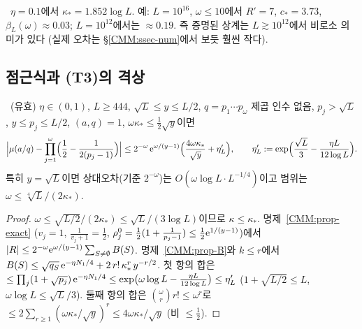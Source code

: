 \begin{remark}\label{CMM:rem-large-num}
\NUMERIC\ $\eta=0.1$에서 $\kappa_*=1.852\log L$. 예: $L=10^{16}$, $\omega\le10$에서 $R'=7$, $c_*=3.73$, $\beta_L(\omega)\approx0.03$;
$L=10^{12}$에서는 $\approx0.19$. 즉 증명된 상계는 $L\gtrsim10^{12}$에서 비로소 의미가 있다
(실제 오차는 \S\ref{CMM:ssec-num}에서 보듯 훨씬 작다).
\end{remark}

\subsection{점근식과 (T3)의 격상}\label{CMM:ssec-asym}

\begin{theorem}[점근식]\label{CMM:thm-asym}
\PROVED\ (유효) $\eta\in(0,1)$, $L\ge444$, $\sqrt L\le y\le L/2$, $q=p_1\cdots p_\omega$ 제곱 인수 없음, $p_j>\sqrt L$, $y\le p_j\le L/2$, $(a,q)=1$,
$\omega\kappa_*\le\frac12\sqrt y$이면
\[
\Bigl|\mu(a/q)-\prod_{j=1}^\omega\Bigl(\frac12-\frac1{2(p_j-1)}\Bigr)\Bigr|\le2^{-\omega}\,\mathrm{e}^{\omega/(y-1)}\Bigl(\frac{4\omega\kappa_*}{\sqrt y}+\eta'_L\Bigr),
\qquad \eta'_L:=\exp\Bigl(\frac{\sqrt L}{3}-\frac{\eta L}{12\log L}\Bigr).
\]
특히 $y=\sqrt L$이면 상대오차(기준 $2^{-\omega}$)는 $O(\omega\log L\cdot L^{-1/4})$이고 범위는 $\omega\le\sqrt[4]L/(2\kappa_*)$.
\end{theorem}
\begin{proof}
$\omega\le\sqrt{L/2}/(2\kappa_*)\le\sqrt L/(3\log L)$이므로 $\kappa\le\kappa_*$. 명제~\ref{CMM:prop-exact} ($v_j=1$, $\frac1{v_j+1}=\frac12$, $\rho^0_j=\frac12(1+\frac1{p_j-1})\le\frac12\mathrm{e}^{1/(y-1)}$)에서
$|R|\le2^{-\omega}\mathrm{e}^{\omega/(y-1)}\sum_{S\ne\emptyset}B(S)$. 명제~\ref{CMM:prop-B}와 $k\le r$에서
$B(S)\le\sqrt{q_S}\,\mathrm{e}^{-\eta N_1/4}+2\,r!\,\kappa_*^r\,y^{-r/2}$. 첫 항의 합은
$\le\prod_j(1+\sqrt{p_j})\,\mathrm{e}^{-\eta N_1/4}\le\exp\bigl(\omega\log L-\frac{\eta L}{12\log L}\bigr)\le\eta'_L$
($1+\sqrt{L/2}\le L$, $\omega\log L\le\sqrt L/3$). 둘째 항의 합은 $\binom\omega r r!\le\omega^r$로
$\le2\sum_{r\ge1}(\omega\kappa_*/\sqrt y)^r\le4\omega\kappa_*/\sqrt y$ (비 $\le\frac12$).
\end{proof}

